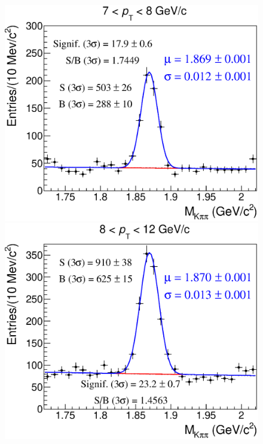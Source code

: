 \documentclass[b5paper,10pt,twoside,oldstyle,classica]{toptesi}
\begin{document}
\begin{figure}[h]
\begin{center}
{\includegraphics[scale = 0.25]{MassFits_cutset1_6.eps}}
\hspace{0cm}
{\includegraphics[scale = 0.25]{MassFits_cutset1_7.eps}}
\vspace{0cm}
\end{center}
\end{figure}
\clearpage
\end{document}
